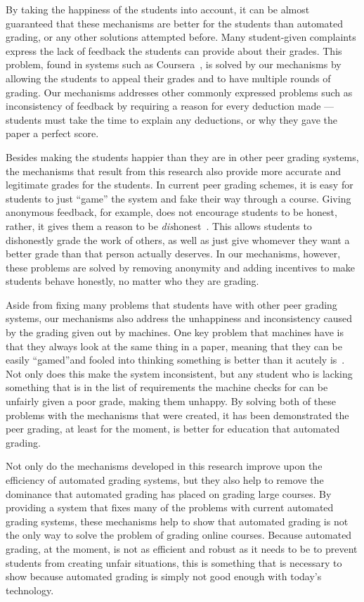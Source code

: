 \documentclass[12pt, Arial]{article}
\begin{document}
By taking the happiness of the students into account, it can be almost guaranteed that these mechanisms are better for the students than automated grading, or any other solutions attempted before. Many student-given complaints express the lack of feedback the students can provide about their grades. This problem, found in systems such as Coursera~\cite{howaccurateispeergrading}, is solved by our mechanisms by allowing the students to appeal their grades and to have multiple rounds of grading. Our mechanisms addresses other commonly expressed problems such as inconsistency of feedback by requiring a reason for every deduction made --- students must take the time to explain any deductions, or why they gave the paper a perfect score.

Besides making the students happier than they are in other peer grading systems, the mechanisms that result from this research also provide more accurate and legitimate grades for the students. In current peer grading schemes, it is easy for students to just ``game'' the system and fake their way through a course. Giving anonymous feedback, for example, does not encourage students to be honest, rather, it gives them a reason to be \emph{dis}honest~\cite{howaccurateispeergrading}. This allows students to dishonestly grade the work of others, as well as just give whomever they want a better grade than that person actually deserves. In our mechanisms, however, these problems are solved by removing anonymity and adding incentives to make students behave honestly, no matter who they are grading.

Aside from fixing many problems that students have with other peer grading systems, our mechanisms also address the unhappiness and inconsistency caused by the grading given out by machines. One key problem that machines have is that they always look at the same thing in a paper, meaning that they can be easily ``gamed''and fooled into thinking something is better than it acutely is~\cite{robogradingproblems}. Not only does this make the system inconsistent, but any student who is lacking something that is in the list of requirements the machine checks for can be unfairly given a poor grade, making them unhappy. By solving both of these problems with the mechanisms that were created, it has been demonstrated the peer grading, at least for the moment, is better for education that automated grading.

Not only do the mechanisms developed in this research improve upon the efficiency of automated grading systems, but they also help to remove the dominance that automated grading has placed on grading large courses. By providing a system that fixes many of the problems with current automated grading systems, these mechanisms help to show that automated grading is not the only way to solve the problem of grading online courses. Because automated grading, at the moment, is not as efficient and robust as it needs to be to prevent students from creating unfair situations, this is something that is necessary to show because automated grading is simply not good enough with today's technology.
\end{document}
